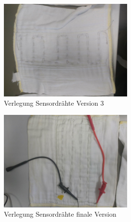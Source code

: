 \begin{figure}[ht!]
  \centering
  \includegraphics[width=0.6\textwidth]{includes/bilder/windel_cap_sensor_3}
  \caption{Verlegung Sensordrähte Version 3}
  \label{fig:a_windel_cap_3}
\end{figure}

\begin{figure}[ht!]
  \centering
  \includegraphics[width=0.6\textwidth]{includes/bilder/windel_cap_sensor_final}
  \caption{Verlegung Sensordrähte finale Version}
  \label{fig:a_windel_cap_final}
\end{figure}
